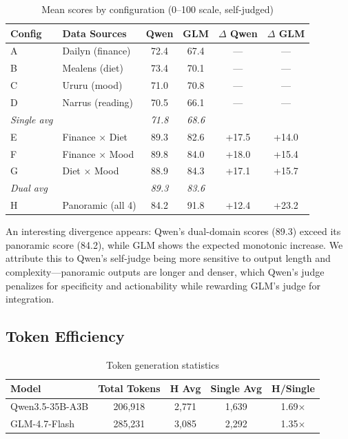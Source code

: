 \documentclass[11pt,a4paper]{article}
\begin{document}
\begin{table}[H]
\centering
\caption{Mean scores by configuration (0--100 scale, self-judged)}
\label{tab:config_scores}
\begin{tabular}{llcccc}
\toprule
\textbf{Config} & \textbf{Data Sources} & \textbf{Qwen} & \textbf{GLM} & \textbf{$\Delta$ Qwen} & \textbf{$\Delta$ GLM} \\
\midrule
A & Dailyn (finance) & 72.4 & 67.4 & --- & --- \\
B & Mealens (diet) & 73.4 & 70.1 & --- & --- \\
C & Ururu (mood) & 71.0 & 70.8 & --- & --- \\
D & Narrus (reading) & 70.5 & 66.1 & --- & --- \\
\textit{Single avg} & & \textit{71.8} & \textit{68.6} & & \\
\midrule
E & Finance $\times$ Diet & 89.3 & 82.6 & +17.5 & +14.0 \\
F & Finance $\times$ Mood & 89.8 & 84.0 & +18.0 & +15.4 \\
G & Diet $\times$ Mood & 88.9 & 84.3 & +17.1 & +15.7 \\
\textit{Dual avg} & & \textit{89.3} & \textit{83.6} & & \\
\midrule
H & Panoramic (all 4) & 84.2 & 91.8 & +12.4 & +23.2 \\
\bottomrule
\end{tabular}
\end{table}

An interesting divergence appears: Qwen's dual-domain scores (89.3) exceed
its panoramic score (84.2), while GLM shows the expected monotonic increase.
We attribute this to Qwen's self-judge being more sensitive to output length
and complexity---panoramic outputs are longer and denser, which Qwen's judge
penalizes for specificity and actionability while rewarding GLM's judge for
integration.

\subsection{Token Efficiency}

\begin{table}[H]
\centering
\caption{Token generation statistics}
\label{tab:tokens}
\begin{tabular}{lcccc}
\toprule
\textbf{Model} & \textbf{Total Tokens} & \textbf{H Avg} & \textbf{Single Avg} & \textbf{H/Single} \\
\midrule
Qwen3.5-35B-A3B & 206,918 & 2,771 & 1,639 & 1.69$\times$ \\
GLM-4.7-Flash & 285,231 & 3,085 & 2,292 & 1.35$\times$ \\
\bottomrule
\end{tabular}
\end{table}
\end{document}
